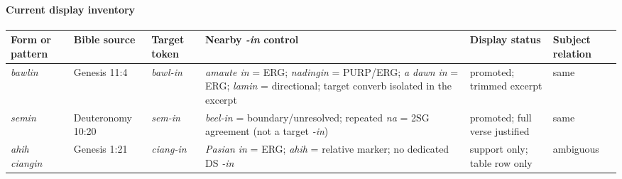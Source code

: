 \documentclass[
  11pt,
  a4paper,
]{article}
\newcounter{none} %
\newcommand{\tdim}[1]{\textit{#1}}
\begin{document}
\paragraph{Current display inventory}\label{current-display-inventory}

{\def\LTcaptype{none} %
\begin{longtable}[]{@{}
  >{\raggedright\arraybackslash}p{}
  >{\raggedright\arraybackslash}p{}
  >{\raggedright\arraybackslash}p{}
  >{\raggedright\arraybackslash}p{}
  >{\raggedright\arraybackslash}p{}
  >{\raggedright\arraybackslash}p{}@{}}
\toprule\noalign{}
\begin{minipage}[b]{\linewidth}\raggedright
Form or pattern
\end{minipage} & \begin{minipage}[b]{\linewidth}\raggedright
Bible source
\end{minipage} & \begin{minipage}[b]{\linewidth}\raggedright
Target token
\end{minipage} & \begin{minipage}[b]{\linewidth}\raggedright
Nearby \tdim{-in} control
\end{minipage} & \begin{minipage}[b]{\linewidth}\raggedright
Display status
\end{minipage} & \begin{minipage}[b]{\linewidth}\raggedright
Subject relation
\end{minipage} \\
\midrule\noalign{}
\endhead
\bottomrule\noalign{}
\endlastfoot
\tdim{bawlin} & Genesis 11:4 & \tdim{bawl-in} & \tdim{amaute in} = ERG;
\tdim{nadingin} = PURP/ERG; \tdim{a dawn in} = ERG; \tdim{lamin} =
directional; target converb isolated in the excerpt & promoted; trimmed
excerpt & same \\
\tdim{semin} & Deuteronomy 10:20 & \tdim{sem-in} & \tdim{beel-in} =
boundary/unresolved; repeated \tdim{na} = 2SG agreement (not a target
\tdim{-in}) & promoted; full verse justified & same \\
\tdim{ahih ciangin} & Genesis 1:21 & \tdim{ciang-in} & \tdim{Pasian in}
= ERG; \tdim{ahih} = relative marker; no dedicated DS \tdim{-in} &
support only; table row only & ambiguous \\

\end{longtable}}
\end{document}
